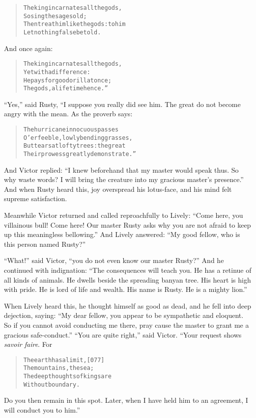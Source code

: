 \documentclass[article, twoside, 14pt]{memoir}
\renewenvironment{verbatim}{%
\begin{quote}%
\vskip -10pt%
\begin{alltt}\normalfont\large}{\end{alltt}%
\end{quote}%
\vskip -10pt
} %
\begin{document}
\begin{verbatim}
The king incarnates all the gods,
    So sing the sages old;
Then treat him like the gods: to him
    Let nothing false be told.
\end{verbatim}
And once again:

\begin{verbatim}
The king incarnates all the gods,
    Yet with a difference:
He pays for good or ill at once;
    The gods, a lifetime hence.”
\end{verbatim}
``Yes,'' said Rusty, “I suppose you really did see him. The great
do not become angry with the mean. As the proverb says:

\begin{verbatim}
The hurricane innocuous passes
O'er feeble, lowly bending grasses,
But tears at lofty trees: the great
Their prowess greatly demonstrate.”
\end{verbatim}
And Victor replied:
``I knew beforehand that my master would speak thus. So why waste words? I will bring the creature into my gracious master's presence.''
And when Rusty heard this, joy overspread his lotus-face, and his
mind felt supreme satisfaction.

Meanwhile Victor returned and called reproachfully to Lively:
``Come here, you villainous bull! Come here! Our master Rusty asks why you are not afraid to keep up this meaningless bellowing.''
And Lively answered:
``My good fellow, who is this person named Rusty?''

``What!'' said Victor, ``you do not even know our master Rusty?''
And he continued with indignation:
``The consequences will teach you. He has a retinue of all kinds of animals. He dwells beside the spreading banyan tree. His heart is high with pride. He is lord of life and wealth. His name is Rusty. He is a mighty lion.''

When Lively heard this, he thought himself as good as dead, and he
fell into deep dejection, saying:
``My dear fellow, you appear to be sympathetic and eloquent. So if you cannot avoid conducting me there, pray cause the master to grant me a gracious safe-conduct.''
``You are quite right,'' said Victor. “Your request shows
\emph{savoir faire}. For

\begin{verbatim}
The earth has a limit,                                  [077]
    The mountains, the sea;
The deep thoughts of kings are
    Without boundary.
\end{verbatim}
Do you then remain in this spot. Later, when I have held him to an
agreement, I will conduct you to him.”
\end{document}
